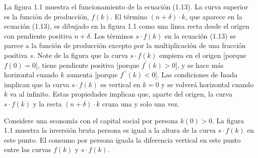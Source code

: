 La figura 1.1 muestra el funcionamiento de la ecuación (1.13). La curva superior es la función de producción, $f\left(k\right)$. El término $\left(n+\delta\right)\cdot k$, que aparece en la ecuación (1.13), es dibujado en la figura 1.1 como una línea recta desde el origen con pendiente positiva $n+\delta$. Los términos $s\cdot f\left(k\right)$ en la ecuación (1.13) se parece a la función de producción excepto por la multiplicación de una fracción positiva $s$. Note de la figura que la curva $s\cdot f\left(k\right)$ empieza en el origen [porque $f\left(0\right)=0$], tiene pendiente positiva [porque $f^{\prime}\left(k\right)>0$], y se hace más horizontal cuando $k$ aumenta [porque $f^{\prime\prime}\left(k\right)<0$]. Las condiciones de Inada implican que la curva $s\cdot f\left(k\right)$ es vertical en $k=0$ y se volverá horizontal cuando $k$ va al infinito. Estas propiedades implican que, aparte del origen, la curva $s\cdot f\left(k\right)$ y la recta $\left(n+\delta\right)\cdot k$ cruza una y solo una vez.

Considere una economía con el capital social por persona $k\left(0\right)>0$. La figura 1.1 muestra la inversión bruta persona es igual a la altura de la curva $s\cdot f\left(k\right)$ en este punto. El consumo por persona iguala la diferencia vertical en este punto entre las curvas $f\left(k\right)$ y $s\cdot f\left(k\right)$.
